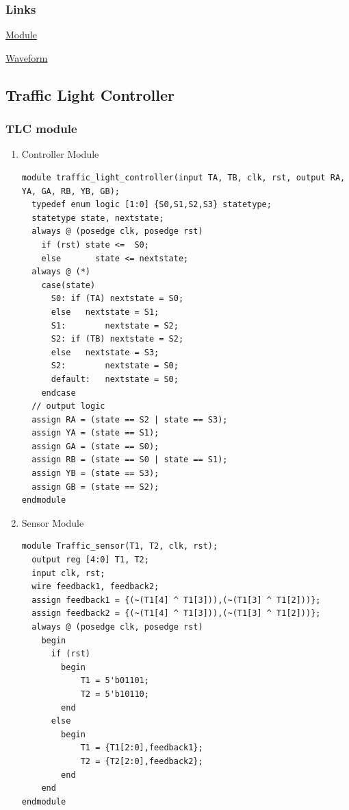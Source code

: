 \documentclass[11pt]{article}
\begin{document}
\subsubsection{Links}
\label{sec:org7f9cd30}

\href{https://www.edaplayground.com/x/3g3D}{Module}

\href{https://www.edaplayground.com/w/x/23g}{Waveform}
\subsection{Traffic Light Controller}
\label{sec:org83dd54c}
\subsubsection{TLC module}
\label{sec:org8eb812c}
\begin{enumerate}
\item Controller Module
\label{sec:orge831b44}
\begin{verbatim}
module traffic_light_controller(input TA, TB, clk, rst, output RA, YA, GA, RB, YB, GB);
  typedef enum logic [1:0] {S0,S1,S2,S3} statetype;
  statetype state, nextstate;
  always @ (posedge clk, posedge rst)
    if (rst) state <=  S0;
    else       state <= nextstate;
  always @ (*)
    case(state)
      S0: if (TA) nextstate = S0;
      else   nextstate = S1;
      S1:        nextstate = S2;
      S2: if (TB) nextstate = S2;
      else   nextstate = S3;
      S2:        nextstate = S0;
      default:   nextstate = S0;
    endcase
  // output logic
  assign RA = (state == S2 | state == S3);
  assign YA = (state == S1);
  assign GA = (state == S0);
  assign RB = (state == S0 | state == S1);
  assign YB = (state == S3);
  assign GB = (state == S2);
endmodule
\end{verbatim}
\item Sensor Module
\label{sec:org7f639f4}
\begin{verbatim}
module Traffic_sensor(T1, T2, clk, rst);
  output reg [4:0] T1, T2;
  input clk, rst;
  wire feedback1, feedback2;
  assign feedback1 = {(~(T1[4] ^ T1[3])),(~(T1[3] ^ T1[2]))};
  assign feedback2 = {(~(T1[4] ^ T1[3])),(~(T1[3] ^ T1[2]))};
  always @ (posedge clk, posedge rst)
    begin
      if (rst)
        begin
            T1 = 5'b01101;
            T2 = 5'b10110;
        end
      else
        begin
            T1 = {T1[2:0],feedback1};
            T2 = {T2[2:0],feedback2};
        end
    end
endmodule
\end{verbatim}
\end{enumerate}
\end{document}
